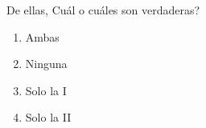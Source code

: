\documentclass[12pt]{article}
\begin{document}
\begin{enumerate}[label=\textbf{\arabic*.}, itemsep=2.5cm]
De ellas, \textquestiondown Cu\'al o cu\'ales son verdaderas?

\begin{enumerate}[label=\Alph*)]
  \item Ambas
  \item Ninguna
  \item Solo la I
  \item Solo la II
\end{enumerate}

\end{enumerate}
\end{document}

